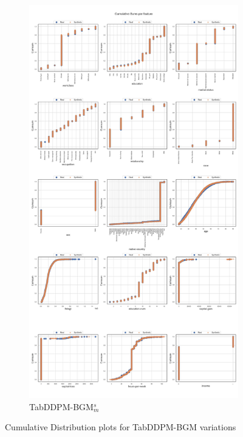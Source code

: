 \begin{landscape}
\begin{figure}[h]
\begin{subfigure}{0.3\linewidth}
			\includegraphics[height=\textheight,width=\linewidth,keepaspectratio]{images/cumsums/tab-ddpm-bgm-simTune-minmax.jpg}
			\caption{TabDDPM-BGM$^{s}_m$}
		\end{subfigure}
		\caption[Cumulative Distribution plots TabDDPM-BGM Models]{Cumulative Distribution plots for TabDDPM-BGM variations}
		\label{fig_a:cumsum_4}
	\end{figure}
\end{landscape}
